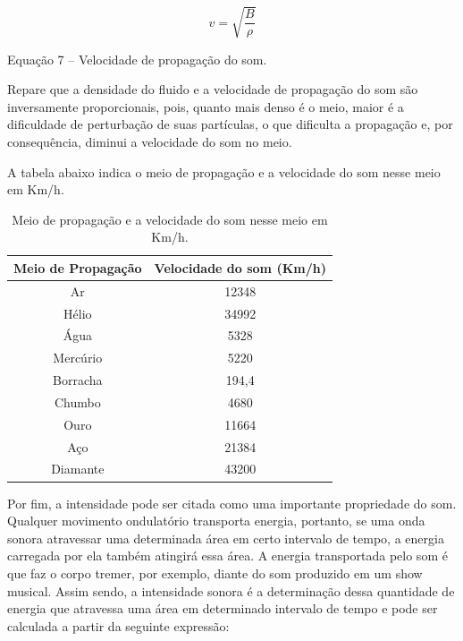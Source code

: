 $$
v= \sqrt{\frac{B}{\rho}}
$$
\begin{center}
    Equação 7 – Velocidade de propagação do som.
\end{center}

Repare que a densidade do fluido e a velocidade de propagação do som são inversamente proporcionais, pois, quanto mais denso é o meio, maior é a dificuldade de perturbação de suas partículas, o que dificulta a propagação e, por consequência, diminui a velocidade do som no meio.

A tabela abaixo indica o meio de propagação e a velocidade do som nesse meio em Km/h.

\begin{table}[hb]
\centering
\begin{tabular}{|c|c|}
\hline
\textbf{Meio de Propagação} & \textbf{Velocidade do som (Km/h)} \\ \hline
Ar                          & 12348                             \\ \hline
Hélio                       & 34992                             \\ \hline
Água                        & 5328                              \\ \hline
Mercúrio                    & 5220                              \\ \hline
Borracha                    & 194,4                             \\ \hline
Chumbo                      & 4680                              \\ \hline
Ouro                        & 11664                             \\ \hline
Aço                         & 21384                             \\ \hline
Diamante                    & 43200                             \\ \hline
\end{tabular}
\caption{Meio de propagação e a velocidade do som nesse meio em Km/h.}
\end{table}

Por fim, a intensidade pode ser citada como uma importante propriedade do som. Qualquer movimento ondulatório transporta energia, portanto, se uma onda sonora atravessar uma determinada área em certo intervalo de tempo, a energia carregada por ela também atingirá essa área. A energia transportada pelo som é que faz o corpo tremer, por exemplo, diante do som produzido em um show musical. Assim sendo, a intensidade sonora é a determinação dessa quantidade de energia que atravessa uma área em determinado intervalo de tempo e pode ser calculada a partir da seguinte expressão:


